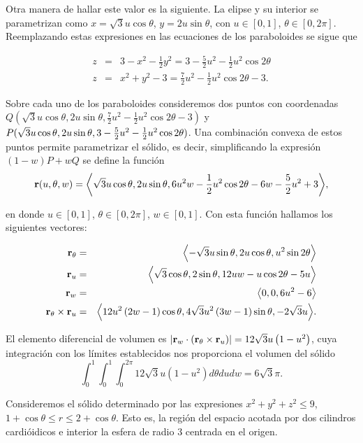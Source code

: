 \begin{parrafonumerado}
Otra manera de hallar este valor es la siguiente. La elipse y su interior se parametrizan como $x=\sqrt{3}u\cos \theta$, $y=2u\sin \theta $, con $u \in [0,1]$, $\theta \in [0,2\pi]$. Reemplazando estas expresiones en las ecuaciones de los paraboloides se sigue que

\begin{eqnarray*}
z &=& 3-x^{2}-\frac{1}{2}y^{2}= 3-\frac{5}{2}u^{2}-\frac{1}{2}u^{2}\cos 2\theta \\
z&=&x^2+y^2-3= \frac{7}{2}u^{2}-\frac{1}{2}u^{2}\cos 2\theta -3.
\end{eqnarray*}

Sobre cada uno de los paraboloides consideremos dos puntos con coordenadas
$Q(\sqrt{3}u\cos \theta ,2u\sin \theta ,\frac{7}{2}u^{2}-\frac{1}{2}u^{2}\cos 2\theta-3)$
y $P(\sqrt{3}u\cos \theta,2u\sin \theta,\\ 3-\frac{5}{2}u^{2}-\frac{1}{2}u^{2}\cos 2\theta)$.
Una combinación convexa de estos puntos permite parametrizar el sólido, es decir, simplificando la expresión $(1-w)P+wQ$ se define la función
%
{\small
\[{\bf r}(u,\theta ,w)=\left\langle\sqrt{3}u\cos\theta,2u\sin\theta,6u^{2}w-\frac{1}{2}u^{2}\cos2\theta -6w-\frac{5}{2}u^{2}+3 \right\rangle\!,\]}
%

en donde $u \in [0,1]$, $\theta \in [0,2\pi] $, $w\in [0,1]$.
Con esta función hallamos los siguientes vectores:

\begin{eqnarray*}
{\bf r}_{\theta}&=& \left\langle -\sqrt{3}u\sin \theta ,2u\cos \theta ,u^{2}\sin 2\theta \right\rangle\\
{\bf r}_{u} &=& \left\langle \sqrt{3}\cos \theta ,2\sin \theta ,12uw-u\cos 2\theta -5u\right\rangle \\
{\bf r}_{w} &=& \left\langle 0,0,6u^{2}-6\right\rangle \\
{\bf r}_{\theta }\times {\bf r}_{u}&=& \left\langle 12u^{2}\left( 2w-1\right)
\cos \theta ,4\sqrt{3}u^{2}\left( 3w-1\right) \sin \theta ,-2\sqrt{3}u \right\rangle\!.
\end{eqnarray*}

El elemento diferencial de volumen es $\left\vert {\bf r}_{w}\cdot \left({\bf r}_{\theta}\times {\bf r}_{u}\right) \right\vert= 12\sqrt{3}u\left( 1-u^{2}\right) $, cuya integración con los límites establecidos nos proporciona el volumen del sólido $$\int_{0}^{1}\int_{0}^{1}\int_{0}^{2\pi }12\sqrt{3}u\left( 1-u^{2}\right)
d\theta dudw= 6\sqrt{3}\pi.$$

\item Consideremos el sólido determinado por las expresiones $x^2+y^2+z^2\leq 9$, $1+\cos\theta \leq r\leq 2+\cos\theta$. Esto es, la región del espacio acotada por dos cilindros cardióidicos e interior la esfera de radio $3$ centrada en el origen.


\end{parrafonumerado}
